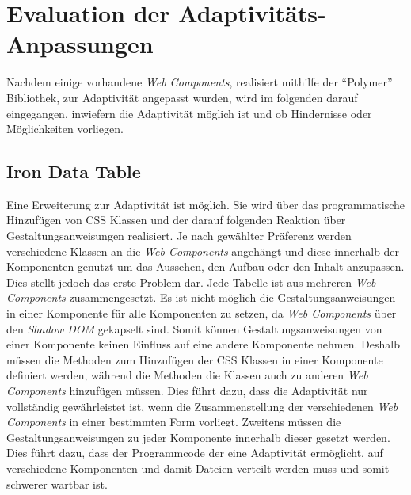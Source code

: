\documentclass[12pt, paper=a4, bibtotoc, toc=listof, headsepline=true, numbers=endperiod]{scrreprt}
\begin{document}
\chapter{Evaluation der Adaptivitäts-Anpassungen}
Nachdem einige vorhandene \emph{Web Components}, realisiert mithilfe der \enquote{Polymer} Bibliothek, zur Adaptivität angepasst wurden, wird im folgenden darauf eingegangen, inwiefern die Adaptivität möglich ist und ob Hindernisse oder Möglichkeiten vorliegen.
	\section{Iron Data Table}
	\label{sec:evaIroDatTab}
	Eine Erweiterung zur Adaptivität ist möglich. Sie wird über das programmatische Hinzufügen von \ac{CSS} Klassen und der darauf folgenden Reaktion über Gestaltungsanweisungen realisiert. Je nach gewählter Präferenz werden verschiedene Klassen an die \emph{Web Components} angehängt und diese innerhalb der Komponenten genutzt um das Aussehen, den Aufbau oder den Inhalt anzupassen. Dies stellt jedoch das erste Problem dar. Jede Tabelle ist aus mehreren \emph{Web Components} zusammengesetzt. Es ist nicht möglich die Gestaltungsanweisungen in einer Komponente für alle Komponenten zu setzen, da \emph{Web Components} über den \emph{Shadow DOM} gekapselt sind. Somit können Gestaltungsanweisungen von einer Komponente keinen Einfluss auf eine andere Komponente nehmen. Deshalb müssen die Methoden zum Hinzufügen der \ac{CSS} Klassen in einer Komponente definiert werden, während die Methoden die Klassen auch zu anderen \emph{Web Components} hinzufügen müssen. Dies führt dazu, dass die Adaptivität nur vollständig gewährleistet ist, wenn die Zusammenstellung der verschiedenen \emph{Web Components} in einer bestimmten Form vorliegt. Zweitens müssen die Gestaltungsanweisungen zu jeder Komponente innerhalb dieser gesetzt werden. Dies führt dazu, dass der Programmcode der eine Adaptivität ermöglicht, auf verschiedene Komponenten und damit Dateien verteilt werden muss und somit schwerer wartbar ist. 
\end{document}

